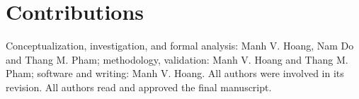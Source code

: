 
\section*{Contributions}
Conceptualization, investigation, and formal analysis: Manh V. Hoang, Nam Do and Thang M. Pham; methodology, validation: Manh V. Hoang and Thang M. Pham; software and writing: Manh V. Hoang. All authors were involved in its revision. All authors read and approved the final manuscript.